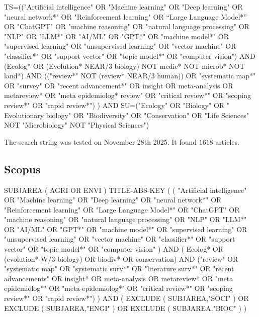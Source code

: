 \documentclass{article}
\begin{document}
TS=(("Artificial intelligence" OR "Machine learning" OR "Deep learning" OR "neural network*" OR "Reinforcement learning" OR “Large Language Model*” OR "ChatGPT" OR "machine reasoning" OR "natural language processing" OR "NLP" OR "LLM*" OR "AI/ML" OR "GPT*" OR "machine model*" OR "supervised learning" OR "unsupervised learning" OR "vector machine" OR "classifier*" OR "support vector" OR "topic model*" OR "computer vision") AND (Ecolog* OR (Evolution* NEAR/3 biology) NOT medic* NOT microb* NOT land*) AND (("review*" NOT (review* NEAR/3 human)) OR "systematic map*" OR "survey" OR "recent advancement*" OR insight OR meta-analysis OR metareview* OR "meta epidemiolog* review" OR "critical review*" OR "scoping review*" OR "rapid review*") ) AND SU=("Ecology" OR "Biology" OR " Evolutionary biology" OR "Biodiversity" OR "Conservation" OR "Life Sciences" NOT "Microbiology" NOT "Physical Sciences")

The search string was tested on November 28th 2025. It found $1618$ articles.

\subsection{Scopus}

SUBJAREA ( AGRI OR ENVI ) TITLE-ABS-KEY ( ( "Artificial intelligence" OR "Machine learning" OR "Deep learning" OR "neural network*" OR "Reinforcement learning" OR "Large Language Model*" OR "ChatGPT" OR "machine reasoning" OR "natural language processing" OR "NLP" OR "LLM*" OR "AI/ML" OR "GPT*" OR "machine model*" OR "supervised learning" OR "unsupervised learning" OR "vector machine" OR "classifier*" OR "support vector" OR "topic model*" OR "computer vision" ) AND ( Ecolog* OR (evolution* W/3 biology) OR biodiv* OR conservation) AND ("review" OR "systematic map" OR "systematic surv*" OR "literature surv*" OR "recent advancements" OR insight* OR meta-analysis OR metareview* OR "meta epidemiolog*" OR "meta-epidemiolog*" OR "critical review*" OR "scoping review*" OR "rapid review*") ) AND ( EXCLUDE ( SUBJAREA,"SOCI" ) OR EXCLUDE ( SUBJAREA,"ENGI" ) OR EXCLUDE ( SUBJAREA,"BIOC" ) )

\end{document}
